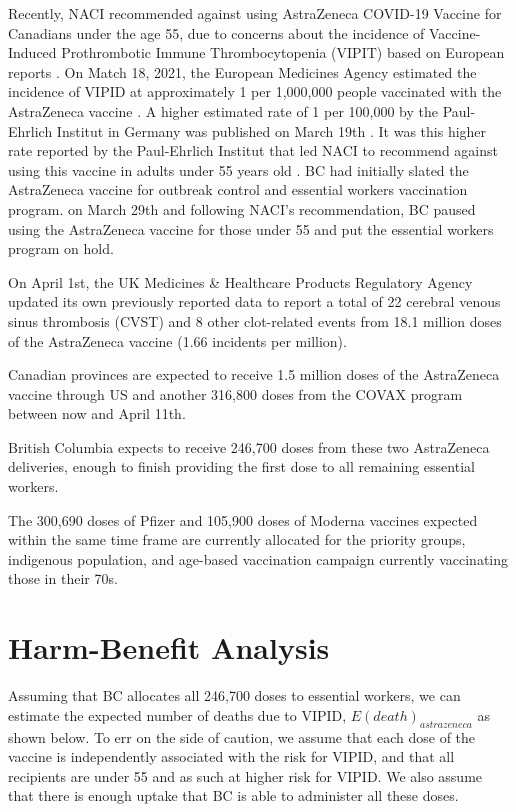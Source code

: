 \documentclass[]{interact}
\theoremstyle{plain}%
\theoremstyle{definition}
\theoremstyle{remark}
\begin{document}
Recently, NACI recommended against using AstraZeneca COVID-19 Vaccine
for Canadians under the age 55, due to concerns about the incidence of
Vaccine-Induced Prothrombotic Immune Thrombocytopenia (VIPIT) based on
European reports \citep{naci_naci_2021}. On Match 18, 2021, the European
Medicines Agency estimated the incidence of VIPID at approximately 1 per
1,000,000 people vaccinated with the AstraZeneca vaccine
\citep{ema_covid-19_2021}. A higher estimated rate of 1 per 100,000 by
the Paul-Ehrlich Institut in Germany was published on March 19th
\citep{pei_covid-19_2021}. It was this higher rate reported by the
Paul-Ehrlich Institut that led NACI to recommend against using this
vaccine in adults under 55 years old \citep{naci_naci_2021}. BC had
initially slated the AstraZeneca vaccine for outbreak control and
essential workers vaccination program. on March 29th and following
NACI's recommendation, BC paused using the AstraZeneca vaccine for those
under 55 and put the essential workers program on hold.

On April 1st, the UK Medicines \& Healthcare Products Regulatory Agency
updated its own previously reported data to report a total of 22
cerebral venous sinus thrombosis (CVST) and 8 other clot-related events
from 18.1 million doses of the AstraZeneca vaccine (1.66 incidents per
million).

Canadian provinces are expected to receive 1.5 million doses of the
AstraZeneca vaccine through US and another 316,800 doses from the COVAX
program between now and April 11th.

British Columbia expects to receive 246,700 doses from these two
AstraZeneca deliveries, enough to finish providing the first dose to all
remaining essential workers.

The 300,690 doses of Pfizer and 105,900 doses of Moderna vaccines
expected within the same time frame are currently allocated for the
priority groups, indigenous population, and age-based vaccination
campaign currently vaccinating those in their 70s.

\hypertarget{harm-benefit-analysis}{%
\section{Harm-Benefit Analysis}\label{harm-benefit-analysis}}

Assuming that BC allocates all 246,700 doses to essential workers, we
can estimate the expected number of deaths due to VIPID,
\(E(death)_{astrazeneca}\) as shown below. To err on the side of
caution, we assume that each dose of the vaccine is independently
associated with the risk for VIPID, and that all recipients are under 55
and as such at higher risk for VIPID. We also assume that there is
enough uptake that BC is able to administer all these doses.
\end{document}
